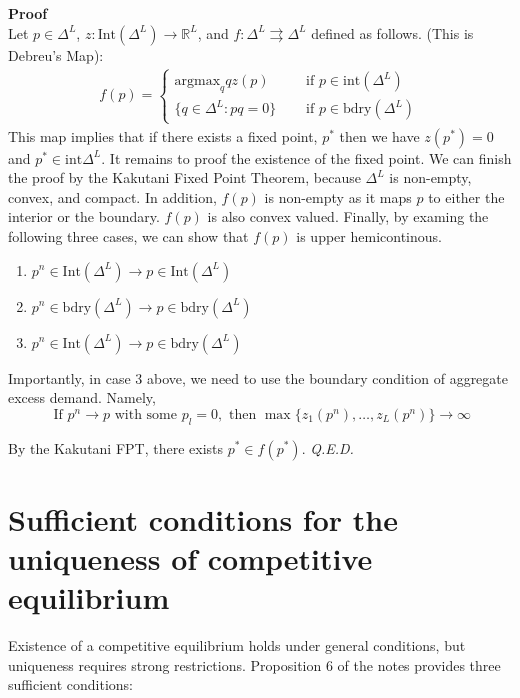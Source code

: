 \noindent \textbf{Proof} \\
Let $p \in \Delta^L$, $z: \text{Int}(\Delta^L) \rightarrow \mathbb{R}^L$,
and $f: \Delta^L  \rightrightarrows \Delta^L $ defined as follows. (This is Debreu's Map):
\begin{align*}
    f(p) = \begin{cases}
        \text{argmax}_q q z(p) \quad & \text{ if } p \in \text{int}(\Delta^L) \\ 
         \{q \in \Delta^L: p q = 0 \}\quad & \text{ if } p \in \text{bdry}(\Delta^L)
    \end{cases}
\end{align*}
This map implies that if there exists a fixed point, $p^*$
then we have $z(p^*) = 0$ and $p^* \in \text{int}{\Delta^L}$.
It remains to proof the existence of the fixed point.
We can finish the proof by the Kakutani Fixed Point Theorem, 
because $\Delta^L$ is non-empty, convex, and compact.
In addition, $f(p)$ is non-empty as it maps $p$ to either the interior or the boundary. 
$f(p)$ is also convex valued. 
Finally, by examing the following three cases, we can show that $f(p)$ is upper hemicontinous.
\begin{enumerate}
    \item $p^n \in \text{Int}(\Delta^L) \rightarrow p \in \text{Int}(\Delta^L)$
    \item $p^n \in \text{bdry}(\Delta^L) \rightarrow p \in \text{bdry}(\Delta^L)$
    \item $p^n \in \text{Int}(\Delta^L) \rightarrow p \in \text{bdry}(\Delta^L)$
\end{enumerate}
Importantly, in case 3 above, we need to use the boundary condition of aggregate excess demand.
Namely, 
\[
\text{ If } p^n \rightarrow p \text{ with some } p_l = 0, \text{ then }
\max \{z_1(p^n), \dots, z_L(p^n) \} \rightarrow \infty 
\]

By the Kakutani FPT, there exists $p^* \in f(p^*)$.
\textit{Q.E.D.}






\section{Sufficient conditions for the uniqueness of competitive equilibrium}
Existence of a competitive equilibrium holds under general conditions, but uniqueness requires strong restrictions. Proposition 6 of the notes provides three sufficient conditions:


